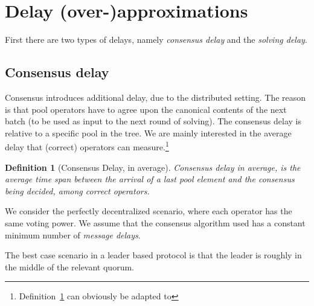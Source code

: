 \documentclass{article}
\newtheorem{definition}{Definition}
\begin{document}
\section{Delay (over-)approximations}%
\label{sec:delay-approximations}

First there are two types of delays, namely
\emph{consensus delay} and the \emph{solving delay}.

\subsection{Consensus delay}
\label{sec:consesnus-delay}

Consensus introduces additional delay,
due to the distributed setting.
The reason is that pool operators have to agree upon
the canonical contents of the next batch
(to be used as input to the next round of solving).
The consensus delay is relative to a specific pool in the tree.
We are mainly interested in the average delay
that (correct) operators can measure.\footnote{%
  Definition~\ref{def:consensus-delay-avg}
  can obviously be adapted to 
}%
\begin{definition}[Consensus Delay, in average]
  \label{def:consensus-delay-avg}
  Consensus delay in average,
  is the average time span
  between the arrival of a last pool element
  and the consensus being decided,
  among correct operators.
\end{definition}

We consider the perfectly decentralized scenario,
where each operator has the same voting power.
We assume that the consensus algorithm used has a
constant minimum number of \emph{message delays}.

The best case scenario in a leader based protocol
is that the leader is roughly in the middle of the relevant quorum.
\end{document}

